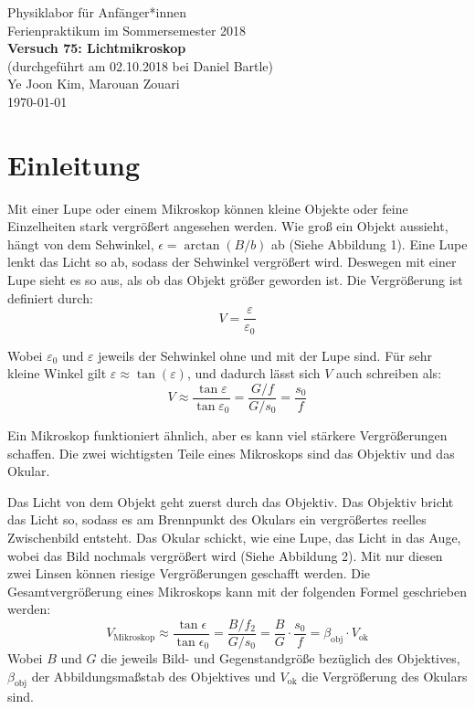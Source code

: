 \documentclass[11pt,a4paper]{article}
\begin{document}
	
	{
		\centering 
		\large 
		Physiklabor für Anfänger*innen \\
		Ferienpraktikum im Sommersemester 2018 \\[4mm]
		\textbf{\LARGE 
			Versuch 75: Lichtmikroskop
		} \\[3mm]
		(durchgeführt am 02.10.2018 bei Daniel Bartle) \\
		Ye Joon Kim, Marouan Zouari\\
		\today \\[10mm]
	}
	\tableofcontents
\section{Einleitung}
Mit einer Lupe oder einem Mikroskop können kleine Objekte oder feine Einzelheiten stark vergrößert angesehen werden. Wie groß ein Objekt aussieht, hängt von dem Sehwinkel, $\epsilon =\arctan(B/b)$ ab (Siehe Abbildung 1). Eine Lupe lenkt das Licht so ab, sodass der Sehwinkel vergrößert wird. Deswegen mit einer Lupe sieht es so aus, als ob das Objekt größer geworden ist. Die Vergrößerung ist definiert durch:
\begin{equation}
V = \frac{\varepsilon}{\varepsilon_0}
\end{equation}

Wobei $\varepsilon_0$ und $\varepsilon$ jeweils der Sehwinkel ohne und mit der Lupe sind. Für sehr kleine Winkel gilt $\varepsilon \approx \tan(\varepsilon)$, und dadurch lässt sich $V$ auch schreiben als:
\begin{equation}
V \approx \frac{\tan\varepsilon}{\tan\varepsilon_0} = \frac{G/f}{G/s_0} = \frac{s_0}{f}
\end{equation}

Ein Mikroskop funktioniert ähnlich, aber es kann viel stärkere Vergrößerungen schaffen. Die zwei wichtigsten Teile eines Mikroskops sind das Objektiv und das Okular. 

Das Licht von dem Objekt geht zuerst durch das Objektiv. Das Objektiv bricht das Licht so, sodass es am Brennpunkt des Okulars ein vergrößertes reelles Zwischenbild entsteht. Das Okular schickt, wie eine Lupe, das Licht in das Auge, wobei das Bild nochmals vergrößert wird (Siehe Abbildung 2). Mit nur diesen zwei Linsen können riesige Vergrößerungen geschafft werden. Die Gesamtvergrößerung eines Mikroskops kann mit der folgenden Formel geschrieben werden:
\begin{equation}
V_\textrm{Mikroskop} \approx \frac{\tan\epsilon}{\tan\epsilon_0}= \frac{B/f_2}{G/s_0} = \frac{B}{G}\cdot\frac{s_0}{f} = \beta_\textrm{obj}\cdot V_\textrm{ok}
\end{equation}
Wobei $B$ und $G$ die jeweils Bild- und Gegenstandgröße bezüglich des Objektives, $\beta_\textrm{obj}$ der Abbildungsmaßstab des Objektives und $V_\textrm{ok}$ die Vergrößerung des Okulars sind. 
\end{document}

